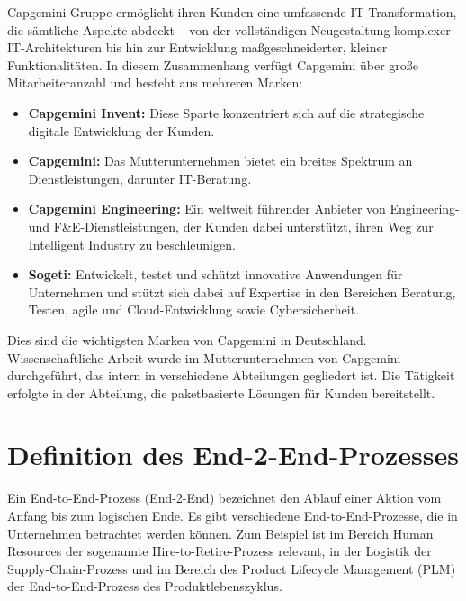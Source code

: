 Capgemini Gruppe ermöglicht ihren Kunden eine umfassende IT-Transformation, die sämtliche Aspekte abdeckt – von der vollständigen Neugestaltung komplexer IT-Architekturen bis hin zur Entwicklung maßgeschneiderter, kleiner Funktionalitäten.  In diesem Zusammenhang verfügt Capgemini über große Mitarbeiteranzahl und besteht aus mehreren Marken:
\begin{itemize}
	\item \textbf{Capgemini Invent:} Diese Sparte konzentriert sich auf die strategische digitale Entwicklung der Kunden.\cite{Capgemini_invent}
	\item \textbf{Capgemini\cite{Capgemini}:} Das Mutterunternehmen bietet ein breites Spektrum an Dienstleistungen, darunter IT-Beratung.
	\item \textbf{Capgemini Engineering:} Ein weltweit führender Anbieter von Engineering- und F\&E-Dienstleistungen, der Kunden dabei unterstützt, ihren Weg zur Intelligent Industry zu beschleunigen.\cite{Capgemini_eng}
	\item \textbf{Sogeti:} Entwickelt, testet und schützt innovative Anwendungen für Unternehmen und stützt sich dabei auf Expertise in den Bereichen Beratung, Testen, agile und Cloud-Entwicklung sowie Cybersicherheit.\cite{Sogeti}
\end{itemize}
Dies sind die wichtigsten Marken von Capgemini in Deutschland. Wissenschaftliche Arbeit wurde im Mutterunternehmen von Capgemini durchgeführt, das intern in verschiedene Abteilungen gegliedert ist. Die Tätigkeit erfolgte in der Abteilung, die paketbasierte Lösungen für Kunden bereitstellt.

\section{Definition des End-2-End-Prozesses}
Ein End-to-End-Prozess (End-2-End) bezeichnet den Ablauf einer Aktion vom Anfang bis zum logischen Ende. Es gibt verschiedene End-to-End-Prozesse, die in Unternehmen betrachtet werden können. Zum Beispiel ist im Bereich Human Resources der sogenannte Hire-to-Retire-Prozess relevant, in der Logistik der Supply-Chain-Prozess und im Bereich des Product Lifecycle Management (PLM) der End-to-End-Prozess des Produktlebenszyklus.\cite{timinger2024modernes}%
